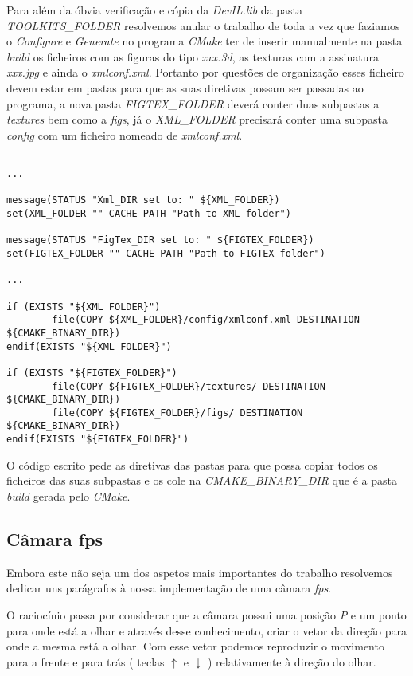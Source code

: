 \documentclass[11pt,a4paper]{report}
\begin{document}
Para além da óbvia verificação e cópia da \emph{DevIL.lib} da pasta \emph{TOOLKITS\_FOLDER} resolvemos anular o trabalho de toda a vez que faziamos o \emph{Configure} e \emph{Generate} no programa \emph{CMake} ter de inserir manualmente na pasta \emph{build} os ficheiros com as figuras do tipo \emph{xxx.3d}, as texturas com a assinatura \emph{xxx.jpg} e ainda o \emph{xmlconf.xml}. Portanto por questões de organização esses ficheiro devem estar em pastas para que as suas diretivas possam ser passadas ao programa, a nova pasta \emph{FIGTEX\_FOLDER} deverá conter duas subpastas a \emph{textures} bem como a \emph{figs}, já o \emph{XML\_FOLDER} precisará conter uma subpasta \emph{config} com um ficheiro nomeado de \emph{xmlconf.xml}.
\begin{lstlisting}[style = cmake]

...

message(STATUS "Xml_DIR set to: " ${XML_FOLDER})
set(XML_FOLDER "" CACHE PATH "Path to XML folder")

message(STATUS "FigTex_DIR set to: " ${FIGTEX_FOLDER})
set(FIGTEX_FOLDER "" CACHE PATH "Path to FIGTEX folder")

...

if (EXISTS "${XML_FOLDER}")
		file(COPY ${XML_FOLDER}/config/xmlconf.xml DESTINATION ${CMAKE_BINARY_DIR})
endif(EXISTS "${XML_FOLDER}")

if (EXISTS "${FIGTEX_FOLDER}")
	    file(COPY ${FIGTEX_FOLDER}/textures/ DESTINATION ${CMAKE_BINARY_DIR})
	    file(COPY ${FIGTEX_FOLDER}/figs/ DESTINATION ${CMAKE_BINARY_DIR})
endif(EXISTS "${FIGTEX_FOLDER}")

\end{lstlisting}

O código escrito pede as diretivas das pastas para que possa copiar todos os ficheiros das suas subpastas e os cole na \emph{CMAKE\_BINARY\_DIR} que é a pasta \emph{build} gerada pelo \emph{CMake}.
\newpage
\subsection{Câmara fps}

Embora este não seja um dos aspetos mais importantes do trabalho resolvemos dedicar uns parágrafos à nossa implementação de uma câmara \emph{fps}.

O raciocínio passa por considerar que a câmara possui uma posição \emph{P} e um ponto para onde está a olhar e através desse conhecimento, criar o vetor da direção para onde a mesma está a olhar. Com esse vetor podemos reproduzir o movimento para a frente e para trás ( teclas $\uparrow$ e $\downarrow$ ) relativamente à direção do olhar.
\end{document}
